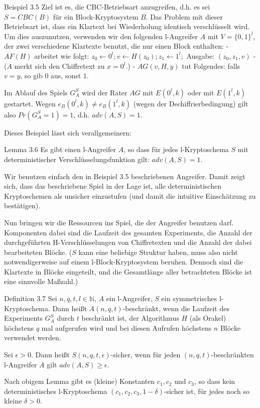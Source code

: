 \documentclass[a4paper]{article}
\begin{document}
\begin{multicols}{3}
Beispiel 3.5 Ziel ist es, die CBC-Betriebsart anzugreifen, d.h. es sei $S=CBC(B)$ für ein Block-Kryptosystem $B$. Das Problem mit dieser Betriebsart ist, dass ein Klartext bei Wiederholung identisch verschlüsselt wird. Um dies auszunutzen, verwenden wir den folgenden l-Angreifer $A$ mit $V=\{0,1\}^l$, der zwei verschiedene Klartexte benutzt, die nur einen Block enthalten:
- $AF(H)$ arbeitet wie folgt: $z_0\leftarrow 0^l;v\leftarrow H(z_0);z_1\leftarrow 1^l;$ Ausgabe: $(z_0,z_1,v)$
- ($A$ merkt sich den Chiffretext zu $x=0^l$.)
- $AG(v,H,y)$ tut Folgendes: falls $v=y$, so gib $0$ aus, sonst $1$.

Im Ablauf des Spiels $G^S_A$ wird der Rater $AG$ mit $E(0^l,k)$ oder mit $E(1^l,k)$ gestartet. Wegen $e_B(0^l,k)\not=e_B(1^l,k)$ (wegen der Dechiffrierbedingung) gilt also $Pr(G^S_A=1)=1$, d.h. $adv(A,S)=1$.

Dieses Beispiel lässt sich verallgemeinern:

Lemma 3.6 Es gibt einen l-Angreifer $A$, so dass für jedes l-Kryptoschema $S$ mit deterministischer Verschlüsselungsfunktion gilt: $adv(A,S) = 1$.

Wir benutzen einfach den in Beispiel 3.5 beschriebenen Angreifer. Damit zeigt sich, dass das beschriebene Spiel in der Lage ist, alle deterministischen Kryptoschemen als unsicher einzustufen (und damit die intuitive Einschätzung zu bestätigen).

Nun bringen wir die Ressourcen ins Spiel, die der Angreifer benutzen darf. Komponenten dabei sind die Laufzeit des gesamten Experiments, die Anzahl der durchgeführten H-Verschlüsselungen von Chiffretexten und die Anzahl der dabei bearbeiteten Blöcke. ($S$ kann eine beliebige Struktur haben, muss also nicht notwendigerweise auf einem l-Block-Kryptosystem beruhen. Dennoch sind die Klartexte in Blöcke eingeteilt, und die Gesamtlänge aller betrachteten Blöcke ist eine sinnvolle Maßzahl.)

Definition 3.7 Sei $n,q,t,l\in\mathbb{N}$, $A$ ein l-Angreifer, $S$ ein symmetrisches l-Kryptoschema. Dann heißt $A(n,q,t)$-beschränkt, wenn die Laufzeit des Experiments $G^S_A$ durch $t$ beschränkt ist, der Algorithmus $H$ (als Orakel) höchstens $q$ mal aufgerufen wird und bei diesen Aufrufen höchstens $n$ Blöcke verwendet werden.

Sei $\epsilon> 0$. Dann heißt $S(n,q,t,\epsilon)$-sicher, wenn für jeden $(n,q,t)$-beschränkten l-Angreifer $A$ gilt $adv(A,S)\geq\epsilon$.

Nach obigem Lemma gibt es (kleine) Konstanten $c_1,c_2$ und $c_3$, so dass kein deterministisches l-Kryptoschema $(c_1,c_2,c_3,1-\delta)$-sicher ist, für jedes noch so kleine $\delta > 0$.


\end{multicols}
\end{document}
